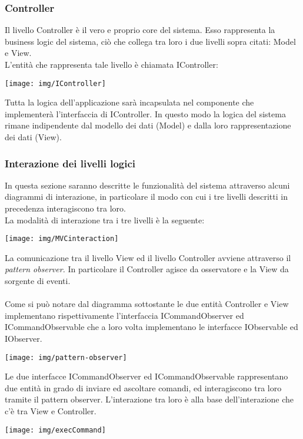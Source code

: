 \documentclass{article}
\begin{document}
  \subsubsection{Controller}
  Il livello Controller è il vero e proprio core del sistema. Esso rappresenta la business logic del sistema, ciò che collega tra loro i due livelli
  sopra citati: Model e View.\\
  L'entità che rappresenta tale livello è chiamata IController:
  \begin{center}
    \texttt{[image: img/IController]}
  \end{center}
  Tutta la logica dell'applicazione sarà incapsulata nel componente che implementerà l'interfaccia di IController. In questo modo la logica del sistema
  rimane indipendente dal modello dei dati (Model) e dalla loro rappresentazione dei dati (View).
  \subsubsection{Interazione dei livelli logici}
  In questa sezione saranno descritte le funzionalità del sistema attraverso alcuni diagrammi di interazione, in particolare il modo con cui i tre livelli descritti
  in precedenza interagiscono tra loro.\\
  La modalità di interazione tra i tre livelli è la seguente:
  \begin{center}
    \texttt{[image: img/MVCinteraction]}
  \end{center}
  La comunicazione tra il livello View ed il livello Controller avviene attraverso il \textit{pattern observer.} In particolare il Controller agisce
  da osservatore e la View da sorgente di eventi.\\
  \\Come si può notare dal diagramma sottostante le due entità Controller e View implementano rispettivamente l'interfaccia ICommandObserver ed ICommandObservable
  che a loro volta implementano le interfacce IObservable ed IObserver.
  \begin{center}
    \texttt{[image: img/pattern-observer]}
  \end{center}
  Le due interfacce ICommandObserver ed ICommandObservable rappresentano due entità in grado di inviare ed ascoltare comandi, ed interagiscono tra
  loro tramite il pattern observer. L'interazione tra loro è alla base dell'interazione che c'è tra View e Controller.
  \begin{center}
    \texttt{[image: img/execCommand]}
  \end{center}
\end{document}
